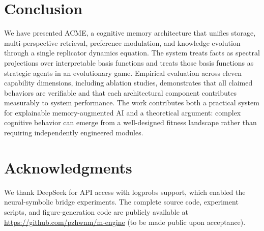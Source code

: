 \documentclass[review]{elsarticle}
\begin{document}
\section{Conclusion}

We have presented ACME, a cognitive memory architecture that unifies storage,
multi-perspective retrieval, preference modulation, and knowledge evolution
through a single replicator dynamics equation. The system treats facts as
spectral projections over interpretable basis functions and treats those
basis functions as strategic agents in an evolutionary game. Empirical
evaluation across eleven capability dimensions, including ablation studies,
demonstrates that all claimed behaviors are verifiable and that each
architectural component contributes measurably to system performance. The
work contributes both a practical system for explainable memory-augmented AI
and a theoretical argument: complex cognitive behavior can emerge from a
well-designed fitness landscape rather than requiring independently
engineered modules.

\section*{Acknowledgments}

We thank DeepSeek for API access with logprobs support, which enabled the
neural-symbolic bridge experiments. The complete source code, experiment
scripts, and figure-generation code are publicly available at
\url{https://github.com/pzhwnm/m-engine} (to be made public upon acceptance).
\end{document}
